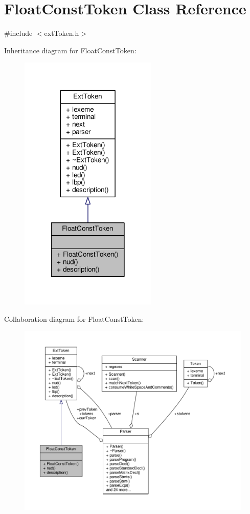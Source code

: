 \hypertarget{classFloatConstToken}{\section{Float\-Const\-Token Class Reference}
\label{classFloatConstToken}
}


{\ttfamily \#include $<$ext\-Token.\-h$>$}



Inheritance diagram for Float\-Const\-Token\-:\nopagebreak
\begin{figure}[H]
\begin{center}
\leavevmode
\includegraphics[width=186pt]{classFloatConstToken__inherit__graph}
\end{center}
\end{figure}


Collaboration diagram for Float\-Const\-Token\-:\nopagebreak
\begin{figure}[H]
\begin{center}
\leavevmode
\includegraphics[width=350pt]{classFloatConstToken__coll__graph}
\end{center}
\end{figure}
